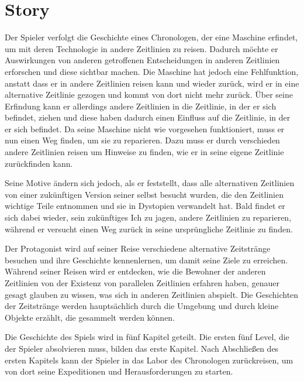 \section{Story}
Der Spieler verfolgt die Geschichte eines Chronologen, der eine Maschine erfindet, um mit deren Technologie in andere Zeitlinien zu reisen. Dadurch möchte er Auswirkungen von anderen getroffenen Entscheidungen in anderen Zeitlinien erforschen und diese sichtbar machen. Die Maschine hat jedoch eine Fehlfunktion, anstatt dass er in andere Zeitlinien reisen kann und wieder zurück, wird er in eine alternative Zeitlinie gezogen und kommt von dort nicht mehr zurück. Über seine Erfindung kann er allerdings andere Zeitlinien in die Zeitlinie, in der er sich befindet, ziehen und diese haben dadurch einen Einfluss auf die Zeitlinie, in der er sich befindet. Da seine Maschine nicht wie vorgesehen funktioniert, muss er nun einen Weg finden, um sie zu reparieren. Dazu muss er durch verschieden andere Zeitlinien reisen um Hinweise zu finden, wie er in seine eigene Zeitlinie zurückfinden kann.

Seine Motive ändern sich jedoch, als er feststellt, dass alle alternativen Zeitlinien von einer zukünftigen Version seiner selbst besucht wurden, die den Zeitlinien wichtige Teile entnommen und sie in Dystopien verwandelt hat. Bald findet er sich dabei wieder, sein zukünftiges Ich zu jagen, andere Zeitlinien zu reparieren, während er versucht einen Weg zurück in seine ursprüngliche Zeitlinie zu finden.

Der Protagonist wird auf seiner Reise verschiedene alternative Zeitstränge besuchen und ihre Geschichte kennenlernen, um damit seine Ziele zu erreichen. Während seiner Reisen wird er entdecken, wie die Bewohner der anderen Zeitlinien von der Existenz von parallelen Zeitlinien erfahren haben, genauer gesagt glauben zu wissen, was sich in anderen Zeitlinien abspielt. Die Geschichten der Zeitstränge werden hauptsächlich durch die Umgebung und durch kleine Objekte erzählt, die gesammelt werden können. 

Die Geschichte des Spiels wird in fünf Kapitel geteilt. Die ersten fünf Level, die der Spieler absolvieren muss, bilden das erste Kapitel. Nach Abschließen des ersten Kapitels kann der Spieler in das Labor des Chronologen zurückreisen, um von dort seine Expeditionen und Herausforderungen zu starten.


